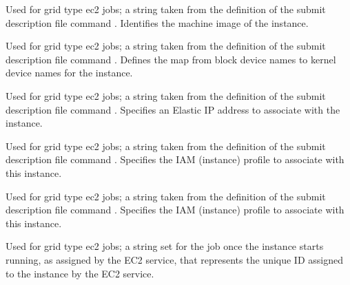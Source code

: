 \begin{description}
\item[\AdAttr{EC2AmiID}:] 
Used for grid type ec2 jobs;
a string taken from the definition of the submit description file command
.
Identifies the machine image of the instance.

\item[\AdAttr{EC2BlockDeviceMapping}:] 
Used for grid type ec2 jobs;
a string taken from the definition of the submit description file command
.
Defines the map from block device names to kernel device names
for the instance.

\item[\AdAttr{EC2ElasticIp}:] 
Used for grid type ec2 jobs;
a string taken from the definition of the submit description file command
.
Specifies an Elastic IP address to associate with the instance.

\item[\AdAttr{EC2IamProfileArn}:]
Used for grid type ec2 jobs;
a string taken from the definition of the submit description file command
.
Specifies the IAM (instance) profile to associate with this instance.

\item[\AdAttr{EC2IamProfileName}:]
Used for grid type ec2 jobs;
a string taken from the definition of the submit description file command
.
Specifies the IAM (instance) profile to associate with this instance.

\item[\AdAttr{EC2InstanceName}:] 
Used for grid type ec2 jobs;
a string set for the job once the instance starts running, 
as assigned by the EC2 service, 
that represents the unique ID assigned to the instance by the EC2 service.



\end{description}
